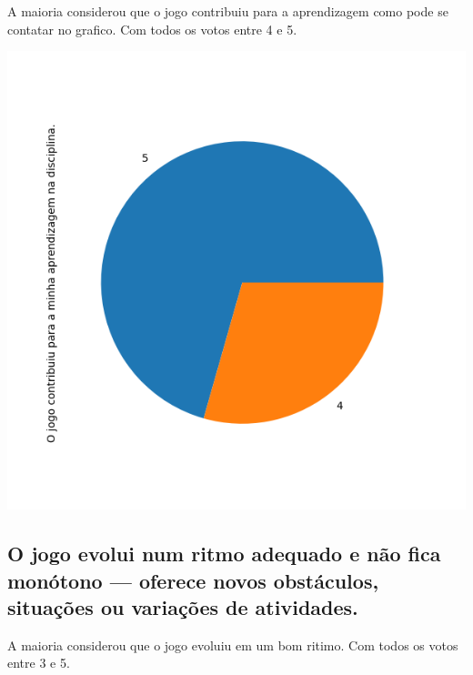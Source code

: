 \documentclass[12pt]{article}
\begin{document}
A maioria considerou que o jogo contribuiu para a aprendizagem como pode se contatar no grafico. Com todos os votos entre 4 e 5.

\begin{center}
  \includegraphics[scale=0.4]{O jogo contribuiu para a minha aprendizagem na disciplina..png}
\end{center}


\subsection{O jogo evolui num ritmo adequado e não fica monótono — oferece novos obstáculos, situações ou variações de atividades.}

A maioria considerou que o jogo evoluiu em um bom ritimo. Com todos os votos entre 3 e 5.
\end{document}
